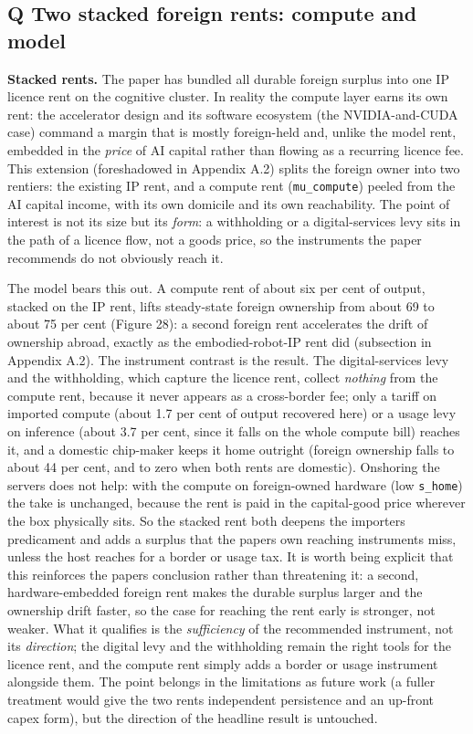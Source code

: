 \documentclass[12pt]{article}
\begin{document}
\hypertarget{q-two-stacked-foreign-rents-compute-and-model}{%
\subsection{Q \textperiodcentered{} Two stacked foreign rents: compute and
model}\label{q-two-stacked-foreign-rents-compute-and-model}}

\textbf{Stacked rents.} The paper has bundled all durable foreign surplus into one
IP licence rent on the cognitive cluster. In reality the compute layer earns its own
rent: the accelerator design and its software ecosystem (the NVIDIA-and-CUDA case)
command a margin that is mostly foreign-held and, unlike the model rent, embedded in
the \emph{price} of AI capital rather than flowing as a recurring licence fee. This
extension (foreshadowed in Appendix A.2) splits the foreign owner into two rentiers:
the existing IP rent, and a compute rent (\texttt{mu\_compute}) peeled from the AI
capital income, with its own domicile and its own reachability. The point of interest
is not its size but its \emph{form}: a withholding or a digital-services levy sits in
the path of a licence flow, not a goods price, so the instruments the paper recommends
do not obviously reach it.

The model bears this out. A compute rent of about six per cent of output, stacked on
the IP rent, lifts steady-state foreign ownership from about 69 to about 75 per cent
(Figure 28): a second foreign rent accelerates the drift of ownership abroad, exactly
as the embodied-robot-IP rent did (subsection in Appendix A.2). The instrument
contrast is the result. The digital-services levy and the withholding, which capture
the licence rent, collect \emph{nothing} from the compute rent, because it never
appears as a cross-border fee; only a tariff on imported compute (about 1.7 per cent
of output recovered here) or a usage levy on inference (about 3.7 per cent, since it
falls on the whole compute bill) reaches it, and a domestic chip-maker keeps it home
outright (foreign ownership falls to about 44 per cent, and to zero when both rents are
domestic). Onshoring the servers does not help: with the compute on foreign-owned
hardware (low \texttt{s\_home}) the take is unchanged, because the rent is paid in the
capital-good price wherever the box physically sits. So the stacked rent both deepens
the importer\textquotesingle s predicament and adds a surplus that the paper\textquotesingle s
own reaching instruments miss, unless the host reaches for a border or usage tax.
It is worth being explicit that this reinforces the paper\textquotesingle s conclusion
rather than threatening it: a second, hardware-embedded foreign rent makes the durable
surplus larger and the ownership drift faster, so the case for reaching the rent early
is stronger, not weaker. What it qualifies is the \emph{sufficiency} of the recommended
instrument, not its \emph{direction}; the digital levy and the withholding remain the
right tools for the licence rent, and the compute rent simply adds a border or usage
instrument alongside them. The point belongs in the limitations as future work (a fuller
treatment would give the two rents independent persistence and an up-front capex form),
but the direction of the headline result is untouched.
\end{document}
